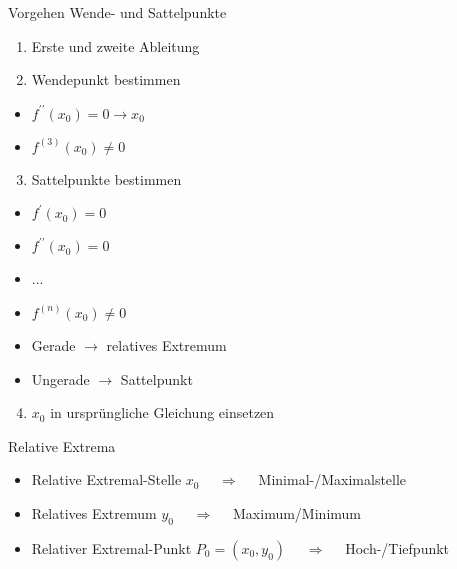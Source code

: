 \begin{KR}{Vorgehen Wende- und Sattelpunkte}
    \begin{enumerate}
  \item Erste und zweite Ableitung

  \item Wendepunkt bestimmen

\end{enumerate}

\begin{itemize}
  \item $f^{\prime \prime}\left(x_{0}\right)=0 \rightarrow x_{0}$
  \item $f^{(3)}\left(x_{0}\right) \neq 0$
\end{itemize}

\begin{enumerate}
  \setcounter{enumi}{2}
  \item Sattelpunkte bestimmen
\end{enumerate}

\begin{itemize}
  \item $f^{\prime}\left(x_{0}\right)=0$
  \item $f^{\prime \prime}\left(x_{0}\right)=0$
  \item ...
  \item $f^{(n)}\left(x_{0}\right) \neq 0$
  \item Gerade $\rightarrow$ relatives Extremum
  \item Ungerade $\rightarrow$ Sattelpunkt
\end{itemize}

\begin{enumerate}
  \setcounter{enumi}{3}
  \item $x_{0}$ in ursprüngliche Gleichung einsetzen
\end{enumerate}
\end{KR}


\begin{definition}{Relative Extrema}
    \begin{itemize}
      \item Relative Extremal-Stelle $x_0$ $\quad \Longrightarrow \quad$ Minimal-/Maximalstelle
    
      \item Relatives Extremum $y_0$ $\quad \Longrightarrow \quad$ Maximum/Minimum
    
      \item Relativer Extremal-Punkt $P_0 = (x_0, y_0)$ $\quad \Longrightarrow \quad$ Hoch-/Tiefpunkt
    
    \end{itemize}
\end{definition}

